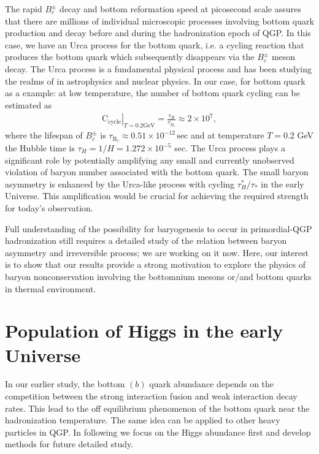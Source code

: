 The rapid $B_c^\pm$ decay and bottom reformation speed at picosecond scale assures that there are millions of individual microscopic processes involving bottom quark production and decay before and during the hadronization epoch of QGP. In this case, we have an Urca process for the bottom quark, i.e. a cycling reaction that produces the bottom quark which subsequently  disappears via the $B_c^\pm$ meson decay. The Urca process is a fundamental physical process  and has been studying the realms of in astrophysics and nuclear physics. In our case, for bottom quark as a example: at low temperature, the number of bottom quark cycling can be estimated as
\begin{align}
\left.\mathrm{C_{cycle}}\right|_{T=0.2\mathrm{GeV}}=\frac{\tau_H}{\tau_{B_c}}\approx2\times10^7,
\end{align}
where the lifespan of $B_c^\pm$ is  $\tau_{\mathrm{B}_c}\approx0.51\times10^{-12}\,\mathrm{sec}$ and at temperature $T=0.2$ GeV the Hubble time is $\tau_H=1/H=1.272\times10^{-5}$ sec. The Urca process plays a significant role by potentially amplifying any small and currently unobserved violation of baryon number associated with the bottom quark. The small baryon asymmetry is enhanced by the Urca-like process with cycling ${\tau^\ast_H}/{\tau_\ast}$ in the early Universe.
This amplification would be crucial for achieving the required strength for today's observation. 


Full understanding of the possibility for baryogenesis to occur in primordial-QGP hadronization still requires a detailed study of the relation between baryon asymmetry and irreversible process; we are working on it now. Here, our interest is to show that our results provide a strong  motivation to explore the physics of baryon nonconservation involving the bottomnium mesons or/and bottom quarks in thermal environment.

\section{{Population of Higgs in the early Universe}}
In our earlier study, the bottom $(b)$ quark abundance depends on the competition between the strong interaction fusion and weak interaction decay rates. This lead to the off equilibrium phenomenon of the bottom quark near the hadronization temperature. The same idea can be applied to other heavy particles in QGP. In following we focus on the Higgs abundance first and develop methods for future detailed study.

